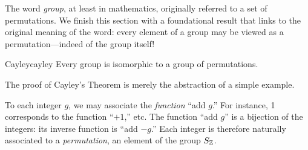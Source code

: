 % 



   
The word \emph{group}, at least in mathematics, originally referred to a set of permutations. We finish this section with a foundational result that links to the original meaning of the word: every element of a group may be viewed as a permutation---indeed of the group itself!

\begin{thm}{Cayley}{cayley}
	Every group is isomorphic to a group of permutations.
\end{thm}

The proof of Cayley's Theorem is merely the abstraction of a simple example.

\begin{example}{}{}
	To each integer $g$, we may associate the \emph{function} ``add $g$.'' For instance, 1 corresponds to the function ``$+1$,'' etc. The function ``add $g$'' is a bijection of the integers: its inverse function is ``add $-g$.'' Each integer is therefore naturally associated to a \emph{permutation}, an element of the group $S_{\mathbb{Z}}$.
\end{example}

